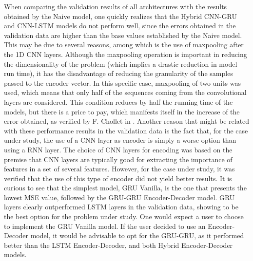 When comparing the validation results of all architectures with the results obtained by the Naive model, one quickly realizes that the Hybrid \ac{CNN}-\ac{GRU} and \ac{CNN}-\ac{LSTM} models do not perform well, since the errors obtained in the validation data are higher than the base values established by the Naive model. This may be due to several reasons, among which is the use of maxpooling after the \ac{1D CNN} layers. Although the maxpooling operation is important in reducing the dimensionality of the problem (which implies a drastic reduction in model run time), it has the disadvantage of reducing the granularity of the samples passed to the encoder vector. In this specific case, maxpooling of two units was used, which means that only half of the sequences coming from the convolutional layers are considered. This condition reduces by half the running time of the models, but there is a price to pay, which manifests itself in the increase of the error obtained, as verified by F. Chollet in \cite{cnn1}. Another reason that might be related with these performance results in the validation data is the fact that, for the case under study, the use of a \ac{CNN} layer as encoder is simply a worse option than using a \ac{RNN} layer. The choice of \ac{CNN} layers for encoding was based on the premise that \ac{CNN} layers are typically good for extracting the importance of features in a set of several features. However, for the case under study, it was verified that the use of this type of encoder did not yield better results. It is curious to see that the simplest model, \ac{GRU} Vanilla, is the one that presents the lowest \ac{MSE} value, followed by the \ac{GRU}-\ac{GRU} Encoder-Decoder model. \ac{GRU} layers clearly outperformed \ac{LSTM} layers in the validation data, showing to be the best option for the problem under study. One would expect a user to choose to implement the \ac{GRU} Vanilla model. If the user decided to use an Encoder-Decoder model, it would be advisable to opt for the \ac{GRU}-\ac{GRU}, as it performed better than the \ac{LSTM} Encoder-Decoder, and both Hybrid Encoder-Decoder models. 

